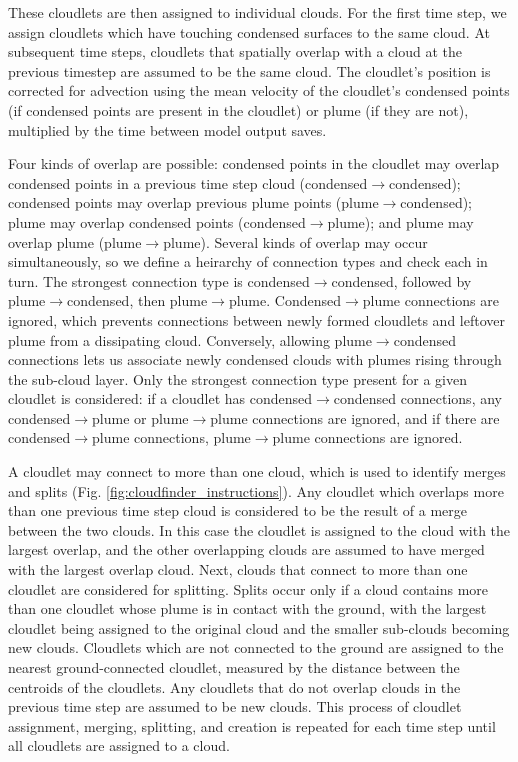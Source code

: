 \documentclass[acp]{copernicus}
\begin{document}
These cloudlets are then assigned to individual clouds.  For the first time 
step, we assign cloudlets which have touching condensed surfaces to the same 
cloud.  At subsequent time steps, cloudlets that spatially overlap with a cloud 
at the previous timestep are assumed to be the same cloud.  The cloudlet's 
position is corrected for advection using the mean velocity of the cloudlet's 
condensed points (if condensed points are present in the cloudlet) or plume 
(if they are not), multiplied by the time between model output saves.

Four kinds of overlap are possible: condensed points in the cloudlet may 
overlap condensed points in a previous time step cloud 
(condensed$\rightarrow$condensed); condensed points may overlap previous 
plume points (plume$\rightarrow$condensed); plume may overlap condensed 
points (condensed$\rightarrow$plume); and plume may overlap plume 
(plume$\rightarrow$plume).  Several kinds of overlap may occur 
simultaneously, so we define a heirarchy of connection types and check each in 
turn.  The strongest connection type is condensed$\rightarrow$condensed, 
followed by plume$\rightarrow$condensed, then plume$\rightarrow$plume.  
Condensed$\rightarrow$plume connections are ignored, which prevents 
connections between newly formed cloudlets and leftover plume from a 
dissipating cloud.  Conversely, allowing plume$\rightarrow$condensed 
connections lets us associate newly condensed clouds with plumes rising through 
the sub-cloud layer.  Only the strongest connection type present for a given 
cloudlet is considered: if a cloudlet has condensed$\rightarrow$condensed 
connections, any condensed$\rightarrow$plume or plume$\rightarrow$plume 
connections are ignored, and if there are condensed$\rightarrow$plume 
connections, plume$\rightarrow$plume connections are ignored.  

A cloudlet may connect to more than one cloud, which is used to identify merges 
and splits (Fig. \ref{fig:cloudfinder_instructions}).  Any cloudlet which 
overlaps more than one previous time step cloud is considered to be the result 
of a merge between the two clouds.  In this case the cloudlet is assigned to 
the cloud with the largest overlap, and the other overlapping clouds are 
assumed to have merged with the largest overlap cloud.  Next, clouds that 
connect to more than one cloudlet are considered for splitting.  Splits occur 
only if a cloud contains more than one cloudlet whose plume is in contact with 
the ground, with the largest cloudlet being assigned to the original cloud and 
the smaller sub-clouds becoming new clouds. Cloudlets which are not connected 
to the ground are assigned to the nearest ground-connected cloudlet, measured 
by the distance between the centroids of the cloudlets.  Any cloudlets that do 
not overlap clouds in the previous time step are assumed to be new clouds.  
This process of cloudlet assignment, merging, splitting, and creation is 
repeated for each time step until all cloudlets are assigned to a cloud.
  
\end{document}
